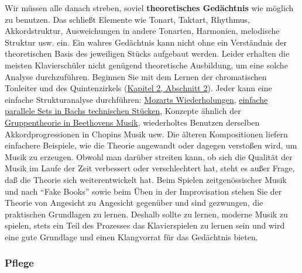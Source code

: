 \label{c1iii6theorie}

Wir müssen alle danach streben, soviel \textbf{theoretisches Gedächtnis} wie möglich zu benutzen.
Das schließt Elemente wie Tonart, Taktart, Rhythmus, Akkordstruktur, Ausweichungen in andere Tonarten, Harmonien, melodische Struktur usw. ein.
Ein wahres Gedächtnis kann nicht ohne ein Verständnis der theoretischen Basis des jeweiligen Stücks aufgebaut werden. 
Leider erhalten die meisten Klavierschüler nicht genügend theoretische Ausbildung, um eine solche Analyse durchzuführen.
Beginnen Sie mit dem Lernen der chromatischen Tonleiter und des Quintenzirkels (\hyperref[c2_2]{Kapitel 2, Abschnitt 2}).
Jeder kann eine einfache Strukturanalyse durchführen: \hyperref[c1iv4]{Mozarts Wiederholungen}, \hyperref[c1iii20]{einfache parallele Sets in Bachs technischen Stücken}, Konzepte ähnlich der \hyperref[c1iv4Gruppe]{Gruppentheorie in Beethovens Musik}, wiederholtes Benutzen derselben Akkordprogressionen in Chopins Musik usw.
Die älteren Kompositionen liefern einfachere Beispiele, wie die Theorie angewandt oder dagegen verstoßen wird, um Musik zu erzeugen.
Obwohl man darüber streiten kann, ob sich die Qualität der Musik im Laufe der Zeit verbessert oder verschlechtert hat, steht es außer Frage, daß die Theorie sich weiterentwickelt hat.
Beim Spielen zeitgenössischer Musik und nach \enquote{Fake Books} sowie beim Üben in der Improvisation stehen Sie der Theorie von Angesicht zu Angesicht gegenüber und sind gezwungen, die praktischen Grundlagen zu lernen.
Deshalb sollte zu lernen, moderne Musik zu spielen, stets ein Teil des Prozesses das Klavierspielen zu lernen sein und wird eine gute Grundlage und einen Klangvorrat für das Gedächtnis bieten.


\subsubsection{Pflege}
\label{c1iii6k}

